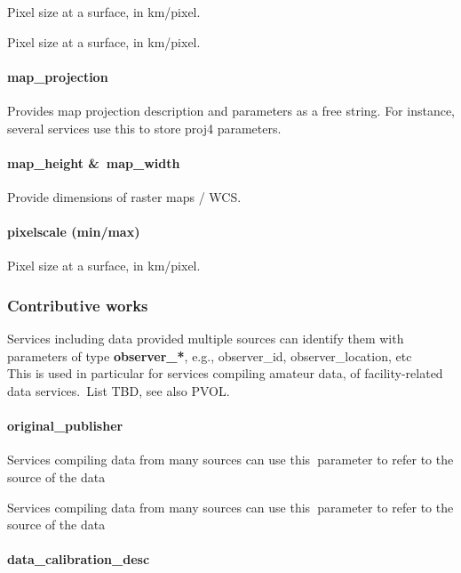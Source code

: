 \documentclass[11pt,a4paper]{ivoa}
\begin{document}
Pixel size at a surface, in km/pixel.

Pixel size at a surface, in km/pixel.

\paragraph{map\_projection}

Provides map projection description and parameters as a free string. For instance, several services use this to store proj4 parameters. 

\paragraph{map\_height \& map\_width}

Provide dimensions of raster maps / WCS.

\paragraph{pixelscale (min/max)}

Pixel size at a surface, in km/pixel.

\subsubsection{Contributive works\\}

Services\textbf{ }including data provided multiple sources can identify them with parameters of type \textbf{observer\_*}, e.g., observer\_id, observer\_location, etc\\This is used in particular for services compiling amateur data, of facility-related data services. List TBD, see also PVOL.

\paragraph{original\_publisher}

Services compiling data from many sources can use this\textbf{ }parameter to refer to the source of the data

Services compiling data from many sources can use this\textbf{ }parameter to refer to the source of the data

\paragraph{data\_calibration\_desc}
\end{document}
